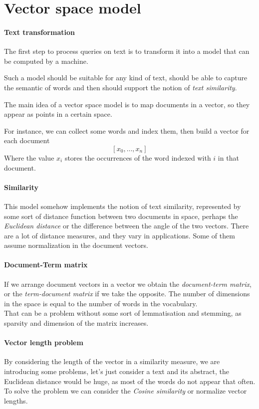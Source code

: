 \section{Vector space model}

\paragraph{Text transformation}
The first step to process queries on text is to transform 
it into a model that can be computed by a machine.

Such a model should be suitable for any kind of text, should be able 
to capture the semantic of words and then should support the notion of
\emph{text similarity}.

The main idea of a vector space model is to map documents in a vector, 
so they appear as points in a certain space.

For instance, we can collect some words and index them, then build a vector 
for each document $$[x_0, \dots, x_n]$$
Where the value $x_i$ stores the occurrences of the word indexed with $i$ 
in that document.

\paragraph{Similarity} 
This model somehow implements the notion of text similarity, represented 
by some sort of distance function between two documents in space, perhaps 
the \emph{Euclidean distance} or the difference between the angle of the two 
vectors.
There are a lot of distance measures, and they vary in applications.
Some of them assume normalization in the document vectors.


\paragraph{Document-Term matrix}
If we arrange document vectors in a vector we obtain the 
\emph{document-term matrix}, or the \emph{term-document matrix} if 
we take the opposite.
The number of dimensions in the space is equal to the 
number of words in the vocabulary. \\
That can be a problem without some sort of lemmatisation and stemming, 
as sparsity and dimension of the matrix increases.

\paragraph{Vector length problem}
By considering the length of the vector in a similarity measure, 
we are introducing some problems, let's just consider a text and its 
abstract, the Euclidean distance would be huge, as most of the words do not 
appear that often. \\
To solve the problem we can consider the \emph{Cosine similarity} or 
normalize vector lengths.


